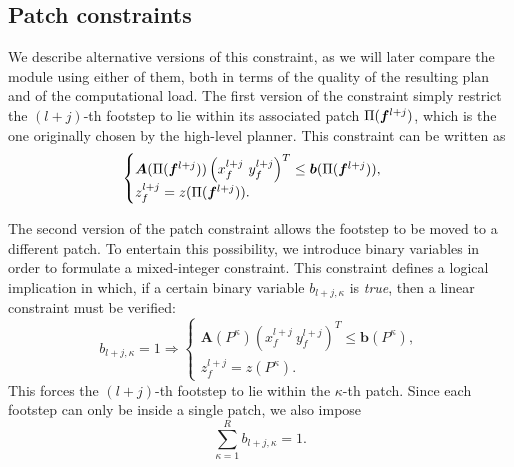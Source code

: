 \subsection{Patch constraints}
\label{sec:FAPA:patch_constraint}

We describe alternative versions of this constraint, as we will later compare the module using either of them, both in terms of the quality of the resulting plan and of the computational load.
The first version of the constraint simply restrict the $(l+j)$-th footstep to lie within its associated patch $\Pi({\bm{f}}^{l+j})$, which is the one originally chosen by the high-level planner. This constraint can be written as
\begin{equation}
    \begin{cases}
		\bm{A}(\Pi({\bm{f}}^{l+j})) \left( x_f^{l+j} \ y_f^{l+j} \right)^T \leq \bm{b}(\Pi({\bm{f}}^{l+j})), \\
		z_f^{l+j} = z(\Pi({\bm{f}}^{l+j})).
    \end{cases}
	\label{eq:FAPA:fixed_patch_constraint}
\end{equation}


The second version of the patch constraint allows the footstep to be moved to a different patch. To entertain this possibility, we introduce binary variables in order to formulate a mixed-integer constraint. This constraint defines a logical implication in which, if a certain binary variable $b_{l+j,\kappa}$ is {\em true}, then a linear constraint must be verified:
\begin{equation}
	b_{l+j,\kappa}=1 \Rightarrow 
	\begin{cases}
		\bm{A}(P^\kappa) \left( x_f^{l+j} \ y_f^{l+j} \right)^T \leq \bm{b}(P^\kappa), \\
		z_f^{l+j} = z(P^\kappa).
	\end{cases}
	\label{eq:FAPA:implication}
\end{equation}
This forces the $(l+j)$-th footstep to lie within the $\kappa$-th patch. Since each footstep can only be inside a single patch, we also impose
\begin{equation}
    \sum^R_{\kappa=1} b_{l+j,\kappa} = 1.
    \label{eq:FAPA:sum_one}
\end{equation}

